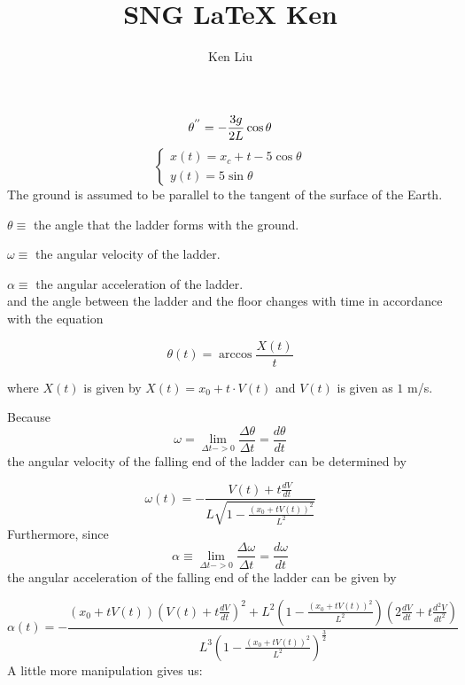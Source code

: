 \documentclass{article}
\title{SNG LaTeX Ken}
\author{Ken Liu}
\begin{document}
\maketitle

\begin{equation}
\theta^{''} = -\frac{3g}{2L}\cos\theta\\
\end{equation}
\begin{equation}
\left\{
\begin{aligned}
x(t) = x_c+t-5\cos\theta\\
y(t)=5\sin\theta
\end{aligned}
\right.
\label{eq:system}
\end{equation}
\noindent The ground is assumed to be parallel to the tangent of the surface of the Earth.

\noindent $\theta \equiv$ the angle that the ladder forms with the ground.

\noindent $\omega \equiv$ the angular velocity of the ladder.

\noindent $\alpha \equiv$ the angular acceleration of the ladder.\\

\noindent and the angle between the ladder and the floor changes with time in accordance with the equation

\begin{equation}
\theta (t) = \arccos \frac{X(t)}{t}
\end{equation}

\noindent where $X(t)$ is given by $X(t) = x_0 + t \cdot V(t)$ and $V(t)$ is given as $1$ m/s.

\noindent Because \[\omega = \lim_{\Delta t -> 0} \frac{\Delta \theta}{\Delta t} = \frac{d\theta}{dt}\] the angular velocity of the falling end of the ladder can be determined by

{\Large
\begin{equation}
\omega(t) = -\frac{V(t) + t\frac{dV}{dt}}{L \sqrt{1 - \frac{(x_0 + tV(t))^2}{L^2}}}
\end{equation}
}
\noindent Furthermore, since 
\[\alpha \equiv \lim_{\Delta t -> 0} \frac{\Delta \omega}{\Delta t} = \frac{d\omega}{dt}\] the angular acceleration of the falling end of the ladder can be given by

{\Large
\begin{equation}
\alpha(t) = - \frac{(x_0+tV(t))(V(t)+t\frac{dV}{dt})^2 + L^2 (1-\frac{(x_0+tV(t))^2}{L^2})(2\frac{dV}{dt}+t\frac{d^2V}{dt^2})}{L^3(1-\frac{(x_0+tV(t))^2}{L^2})^\frac{3}{2}}
\end{equation}
}
\noindent A little more manipulation gives us:
\end{document}

